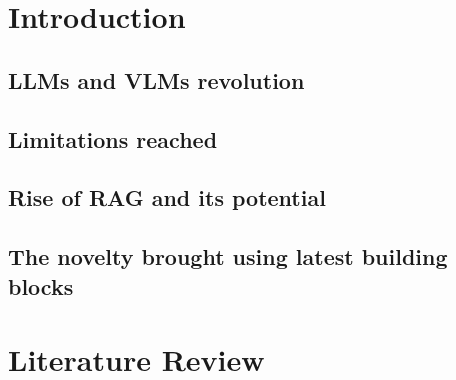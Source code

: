 \documentclass[12pt,twoside]{report}
\date{June 2025}
\begin{document}



\clearpage{\pagestyle{empty}\cleardoublepage}
\setcounter{page}{1}
\pagestyle{fancy}




\tableofcontents 


\clearpage{\pagestyle{empty}\cleardoublepage}
\setcounter{page}{1}
\fancyhead[LE,RO]{\slshape \rightmark}
\fancyhead[LO,RE]{\slshape \leftmark}

\chapter{Introduction}

\section{LLMs and VLMs revolution}

\section{Limitations reached}

\section{Rise of RAG and its potential}

\section{The novelty brought using latest building blocks}

\chapter{Literature Review}
\end{document}
